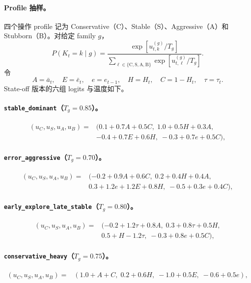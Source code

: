 \paragraph{Profile 抽样。}
四个操作 profile 记为 Conservative（C）、Stable（S）、Aggressive（A）和 Stubborn（B）。对给定 family $g$，
\begin{equation}
    P(K_t=k\mid g)
    =
    \frac{
        \exp[u_{t,k}^{(g)}/T_g]
    }{
        \sum_{\ell\in\{\mathrm C,\mathrm S,\mathrm A,\mathrm B\}}
        \exp[u_{t,\ell}^{(g)}/T_g]
    }.
    \label{eq:modelv14-profile-softmax}
\end{equation}
令
\[
    A=\bar a_t,\quad
    E=\bar e_t,\quad
    e=e_{t-1},\quad
    H=H_t,\quad
    C=1-H_t,\quad
    \tau=\tau_t.
\]
State-off 版本的六组 logits 与温度如下。

\paragraph{\texttt{stable\_dominant}（$T_g=0.85$）。}
\begin{align}
    (u_C,u_S,u_A,u_B)
    ={}&
    (0.1+0.7A+0.5C,\;
     1.0+0.5H+0.3A,\nonumber\\
    &-0.4+0.7E+0.6H,\;
     -0.3+0.7e+0.5C),
    \label{eq:modelv14-family-stable}
\end{align}

\paragraph{\texttt{error\_aggressive}（$T_g=0.70$）。}
\begin{align}
    (u_C,u_S,u_A,u_B)
    ={}&
    (-0.2+0.9A+0.6C,\;
     0.2+0.4H+0.4A,\nonumber\\
    &0.3+1.2e+1.2E+0.8H,\;
     -0.5+0.3e+0.4C),
    \label{eq:modelv14-family-error}
\end{align}

\paragraph{\texttt{early\_explore\_late\_stable}（$T_g=0.80$）。}
\begin{align}
    (u_C,u_S,u_A,u_B)
    ={}&
    (-0.2+1.2\tau+0.8A,\;
     0.3+0.8\tau+0.5H,\nonumber\\
    &0.5+H-1.2\tau,\;
     -0.3+0.8e+0.5C),
    \label{eq:modelv14-family-early}
\end{align}

\paragraph{\texttt{conservative\_heavy}（$T_g=0.75$）。}
\begin{align}
    (u_C,u_S,u_A,u_B)
    ={}&
    (1.0+A+C,\;
     0.2+0.6H,\;
     -1.0+0.5E,\;
     -0.6+0.5e),
    \label{eq:modelv14-family-conservative}
\end{align}

